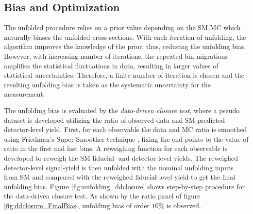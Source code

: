 \subsection{Bias and Optimization}
\label{subsec:Bias}

The unfolded procedure relies on a prior value depending on the SM MC which naturally biases the unfolded cross-sections. With each iteration of unfolding, the algorithm improves the knowledge of the prior, thus, reducing the unfolding bias. However, with increasing number of iterations, the repeated bin migrations amplifies the statistical fluctuations in data, resulting in larger values of statistical uncertainties. Therefore, a finite number of iteration is chosen and the resulting unfolding bias is taken as the systematic uncertainty for the measurement. 

The unfolding bias is evaluated by the \textit{data-driven closure test}, where a pseudo dataset is developed utilizing the ratio of observed data and SM-predicted detector-level yield. First, for each observable the data and MC ratio is smoothed using Friedman's Super Smoother technique \cite{}, fixing the end points to the value of ratio in the first and last bins. A reweighing function for each observable is developed to reweigh the SM fiducial- and detector-level yields. The reweighed detector-level signal-yield is then unfolded with the nominal unfolding inputs from SM and compared with the reweighed fiducial-level yield to get the final unfolding bias. Figure \ref{fig:unfolding_ddclosure} shows step-by-step procedure for the data-driven closure test. As shown by the ratio panel of figure \ref{fig:ddclosure_FinalBias}, unfolding bias of order $10\%$ is observed. 

